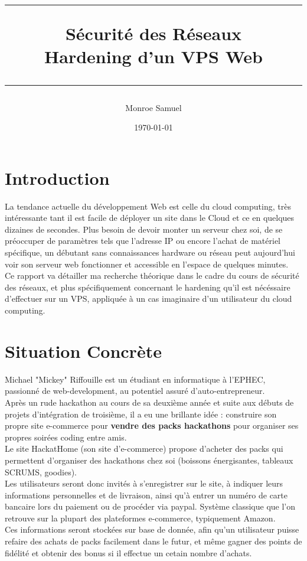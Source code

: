 \documentclass[a4paper,10pt,final,fleqn]{article}
\title{
	\parbox{15cm}
	{ %
	  \vspace{3cm}
		\begin{center}\sf\bfseries\Huge
			\rule{15cm}{1pt}
			\medskip
			Sécurité des Réseaux \\
			\huge Hardening d'un VPS Web
			\vspace{.5cm}
			\rule{15cm}{1pt}
		\end{center}
		\vspace{3cm}
	 }}
\author{Monroe Samuel}
\date{\today}
\begin{document}
	\maketitle
	\newpage

		\section{Introduction}

			La tendance actuelle du développement Web est celle du cloud computing, très intéressante tant il est facile de déployer un site dans le Cloud et ce en quelques dizaines de secondes. Plus besoin de devoir monter un serveur chez soi, de se préoccuper de paramètres tels que l'adresse IP ou encore l'achat de matériel spécifique, un débutant sans connaissances hardware ou réseau peut aujourd'hui voir son serveur web fonctionner et accessible en l'espace de quelques minutes.\\

			Ce rapport va détailler ma recherche théorique dans le cadre du cours de sécurité des réseaux, et plus spécifiquement concernant le hardening qu'il est nécéssaire d'effectuer sur un VPS, appliquée à un cas imaginaire d'un utilisateur du cloud computing.


		\section{Situation Concrète}

			Michael "Mickey" Riffouille est un étudiant en informatique à l'EPHEC, passionné de web-development, au potentiel assuré d'auto-entrepreneur.\\
			Après un rude hackathon au cours de sa deuxième année et suite aux débuts de projets d'intégration de troisième, il a eu une brillante idée : construire son propre site e-commerce pour \textbf{vendre des packs hackathons} pour organiser ses propres soirées coding entre amis.\\

			Le site HackatHome (son site d'e-commerce) propose d'acheter des packs qui permettent d'organiser des hackathons chez soi (boissons énergisantes, tableaux SCRUMS, goodies).\\

			Les utilisateurs seront donc invités à s'enregistrer sur le site, à indiquer leurs informations personnelles et de livraison, ainsi qu'à entrer un numéro de carte bancaire lors du paiement ou de procéder via paypal. Système classique que l'on retrouve sur la plupart des plateformes e-commerce, typiquement Amazon.\\
			Ces informations seront stockées sur base de donnée, afin qu'un utilisateur puisse refaire des achats de packs facilement dans le futur, et même gagner des points de fidélité et obtenir des bonus si il effectue un cetain nombre d'achats.\\
\end{document}
